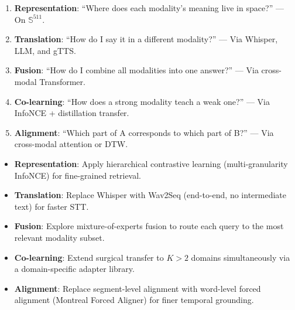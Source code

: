 \documentclass[12pt,a4paper]{article}
\theoremstyle{definition}
\theoremstyle{plain}
\theoremstyle{remark}
\newcommand{\Sph}{\mathbb{S}}
\begin{document}
\begin{tcolorbox}[mmlbox,title={One-Sentence Summary per Challenge}]
\begin{enumerate}[nosep,label=\textbf{C\arabic*.}]
  \item \textbf{Representation}: ``Where does each modality's meaning live in space?'' — On $\Sph^{511}$.
  \item \textbf{Translation}: ``How do I say it in a different modality?'' — Via Whisper, LLM, and gTTS.
  \item \textbf{Fusion}: ``How do I combine all modalities into one answer?'' — Via cross-modal Transformer.
  \item \textbf{Co-learning}: ``How does a strong modality teach a weak one?'' — Via InfoNCE + distillation transfer.
  \item \textbf{Alignment}: ``Which part of A corresponds to which part of B?'' — Via cross-modal attention or DTW.
\end{enumerate}
\end{tcolorbox}

\vfill
\begin{center}
\begin{tcolorbox}[keybox,width=0.85\textwidth,title={Future Directions}]
\begin{itemize}[nosep]
  \item \textbf{Representation}: Apply hierarchical contrastive learning (multi-granularity InfoNCE) for fine-grained retrieval.
  \item \textbf{Translation}: Replace Whisper with Wav2Seq (end-to-end, no intermediate text) for faster STT.
  \item \textbf{Fusion}: Explore mixture-of-experts fusion to route each query to the most relevant modality subset.
  \item \textbf{Co-learning}: Extend surgical transfer to $K > 2$ domains simultaneously via a domain-specific adapter library.
  \item \textbf{Alignment}: Replace segment-level alignment with word-level forced alignment (Montreal Forced Aligner) for finer temporal grounding.
\end{itemize}
\end{tcolorbox}
\end{center}
\end{document}
